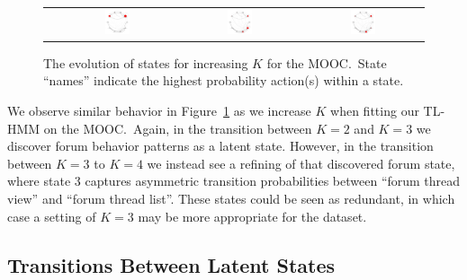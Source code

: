 \begin{figure}
\begin{tabular}{cccc}
    &
    \includegraphics[width=0.22\textwidth]{figures/sustain-4state/state3.png}
    &
    \includegraphics[width=0.22\textwidth]{figures/sustain-4state/state1.png}
    &
    \includegraphics[width=0.22\textwidth]{figures/sustain-4state/state2.png}
  \end{tabular}
  \caption{The evolution of states for increasing $K$ for the
  \protect\sustain{} MOOC.\ State ``names'' indicate the highest
  probability action(s) within a state.} %
  \label{fig:sustain-state-evolution}
\end{figure}

We observe similar behavior in Figure~\ref{fig:sustain-state-evolution}
as we increase $K$ when fitting our TL-HMM on the \sustain{} MOOC.\ Again,
in the transition between $K=2$ and $K=3$ we discover forum behavior
patterns as a latent state. However, in the transition between $K=3$ to
$K=4$ we instead see a refining of that discovered forum state, where
state 3 captures asymmetric transition probabilities between ``forum thread
view'' and ``forum thread list''. These states could be seen as redundant,
in which case a  setting of $K=3$ may be more appropriate for the
\sustain{} dataset.

\subsection{Transitions Between Latent States}

